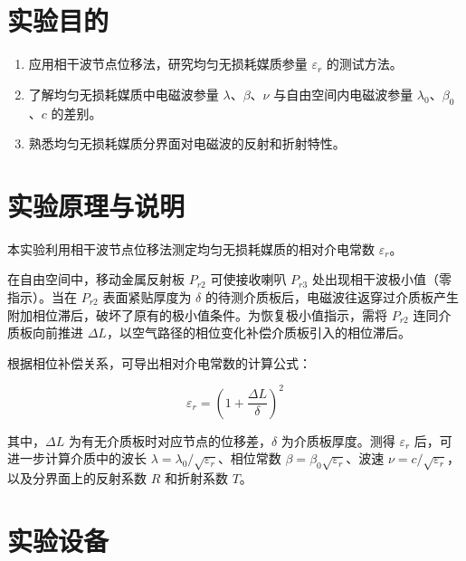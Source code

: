 \documentclass{../ElectromagneticFieldTemplate}
\begin{document}
\maketitle


\section{实验目的}

\begin{enumerate}
    \item 应用相干波节点位移法，研究均匀无损耗媒质参量 \(\varepsilon_r\) 的测试方法。
    \item 了解均匀无损耗媒质中电磁波参量 \(\lambda\)、\(\beta\)、\(\nu\) 与自由空间内电磁波参量 \(\lambda_0\)、\(\beta_0\)、\(c\) 的差别。
    \item 熟悉均匀无损耗媒质分界面对电磁波的反射和折射特性。
\end{enumerate}

\section{实验原理与说明}

本实验利用相干波节点位移法测定均匀无损耗媒质的相对介电常数 \(\varepsilon_r\)。

在自由空间中，移动金属反射板 \(P_{r2}\) 可使接收喇叭 \(P_{r3}\) 处出现相干波极小值（零指示）。当在 \(P_{r2}\) 表面紧贴厚度为 \(\delta\) 的待测介质板后，电磁波往返穿过介质板产生附加相位滞后，破坏了原有的极小值条件。为恢复极小值指示，需将 \(P_{r2}\) 连同介质板向前推进 \(\Delta L\)，以空气路径的相位变化补偿介质板引入的相位滞后。

根据相位补偿关系，可导出相对介电常数的计算公式：

\[
\varepsilon_r = \left(1 + \frac{\Delta L}{\delta}\right)^2
\]

其中，\(\Delta L\) 为有无介质板时对应节点的位移差，\(\delta\) 为介质板厚度。测得 \(\varepsilon_r\) 后，可进一步计算介质中的波长 \(\lambda = \lambda_0 / \sqrt{\varepsilon_r}\)、相位常数 \(\beta = \beta_0 \sqrt{\varepsilon_r}\)、波速 \(\nu = c / \sqrt{\varepsilon_r}\)，以及分界面上的反射系数 \(R\) 和折射系数 \(T\)。

\section{实验设备}
\end{document}
